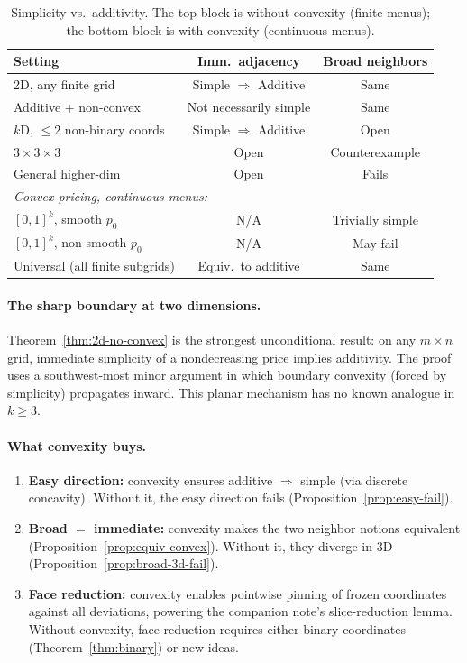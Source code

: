 \documentclass[11pt]{article}
\begin{document}
\begin{table}[h]
\centering
\renewcommand{\arraystretch}{1.2}
\begin{tabular}{lcc}
\hline
Setting & Imm.\ adjacency & Broad neighbors \\
\hline
2D, any finite grid & Simple $\Rightarrow$ Additive & Same \\
Additive + non-convex & Not necessarily simple & Same \\
$k$D, $\leq 2$ non-binary coords & Simple $\Rightarrow$ Additive & Open \\
$3 \times 3 \times 3$ & Open & Counterexample \\
General higher-dim & Open & Fails \\
\hline
\multicolumn{3}{l}{\emph{Convex pricing, continuous menus:}} \\
\hline
$[0,1]^k$, smooth $p_0$ & N/A & Trivially simple \\
$[0,1]^k$, non-smooth $p_0$ & N/A & May fail \\
Universal (all finite subgrids) & Equiv.\ to additive & Same \\
\hline
\end{tabular}
\caption{Simplicity vs.\ additivity.  The top block is without
convexity (finite menus); the bottom block is with convexity
(continuous menus).}
\label{tab:summary}
\end{table}

\paragraph{The sharp boundary at two dimensions.}
Theorem~\ref{thm:2d-no-convex} is the strongest unconditional result:
on any $m \times n$ grid, immediate simplicity of a nondecreasing
price implies additivity.  The proof uses a southwest-most minor
argument in which boundary convexity (forced by simplicity)
propagates inward.  This planar mechanism has no known analogue in
$k \geq 3$.

\paragraph{What convexity buys.}
\begin{enumerate}[label=(\alph*)]
  \item \textbf{Easy direction:} convexity ensures additive
    $\Rightarrow$ simple (via discrete concavity).  Without it, the
    easy direction fails (Proposition~\ref{prop:easy-fail}).

  \item \textbf{Broad $=$ immediate:} convexity makes the two neighbor
    notions equivalent (Proposition~\ref{prop:equiv-convex}).  Without
    it, they diverge in 3D
    (Proposition~\ref{prop:broad-3d-fail}).

  \item \textbf{Face reduction:} convexity enables pointwise pinning
    of frozen coordinates against all deviations, powering the
    companion note's slice-reduction lemma.  Without convexity,
    face reduction requires either binary coordinates
    (Theorem~\ref{thm:binary}) or new ideas.
\end{enumerate}
\end{document}
